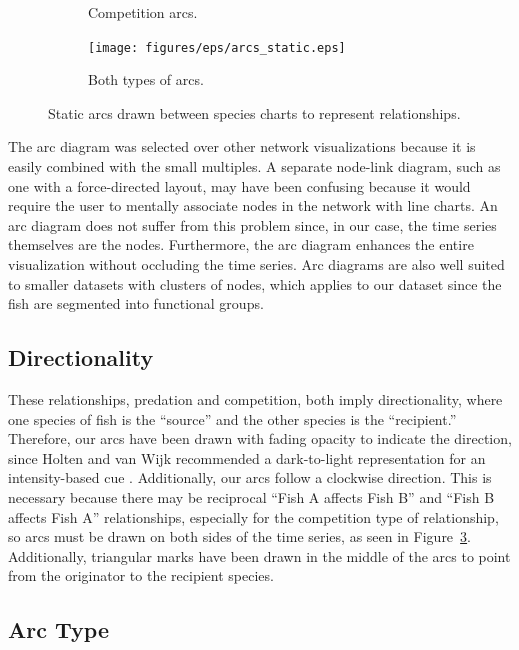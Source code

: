 \begin{figure}
\begin{subfigure}[b]{0.33\textwidth}
		\caption{Competition arcs.}
		\label{fig:arcsCompetition}
	\end{subfigure}
	\begin{subfigure}[b]{0.32\textwidth}
		\centering
		\texttt{[image: figures/eps/arcs\_static.eps]}
		\caption{Both types of arcs.}
		\label{fig:arcsBoth}
	\end{subfigure}
	\caption{Static arcs drawn between species charts to represent relationships.}
	\label{fig:betweenSpeciesArcs}
\end{figure}

The arc diagram was selected over other network visualizations because it is easily combined with the small multiples.  A separate node-link diagram, such as one with a force-directed layout, may have been confusing because it would require the user to mentally associate nodes in the network with line charts.  An arc diagram does not suffer from this problem since, in our case, the time series themselves are the nodes.  Furthermore, the arc diagram enhances the entire visualization without occluding the time series.  Arc diagrams are also well suited to smaller datasets with clusters of nodes, which applies to our dataset since the fish are segmented into functional groups.

\subsection{Directionality}

These relationships, predation and competition, both imply directionality, where one species of fish is the ``source'' and the other species is the ``recipient.''  Therefore, our arcs have been drawn with fading opacity to indicate the direction, since Holten and van Wijk recommended a dark-to-light representation for an intensity-based cue \cite{holten2009}.  Additionally, our arcs follow a clockwise direction.  This is necessary because there may be reciprocal ``Fish A affects Fish B'' and ``Fish B affects Fish A'' relationships, especially for the competition type of relationship, so arcs must be drawn on both sides of the time series, as seen in Figure~\ref{fig:betweenSpeciesArcs}.  Additionally, triangular marks have been drawn in the middle of the arcs to point from the originator to the recipient species.

\subsection{Arc Type}

